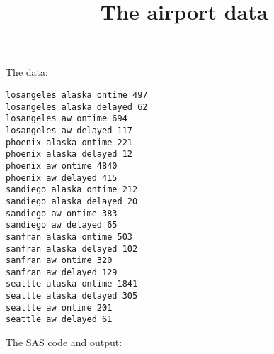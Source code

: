 \documentclass{article}
\title{The airport data}
\begin{document}
\maketitle
The data:
\begin{verbatim}
losangeles alaska ontime 497
losangeles alaska delayed 62
losangeles aw ontime 694
losangeles aw delayed 117
phoenix alaska ontime 221
phoenix alaska delayed 12
phoenix aw ontime 4840
phoenix aw delayed 415
sandiego alaska ontime 212
sandiego alaska delayed 20
sandiego aw ontime 383
sandiego aw delayed 65
sanfran alaska ontime 503
sanfran alaska delayed 102
sanfran aw ontime 320
sanfran aw delayed 129
seattle alaska ontime 1841
seattle alaska delayed 305
seattle aw ontime 201
seattle aw delayed 61
\end{verbatim}
The SAS code and output:
\end{document}
